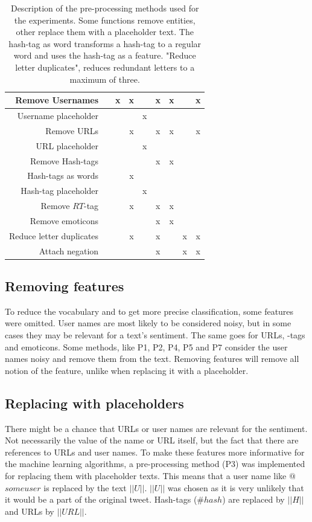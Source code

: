 \begin{table}[t!]
\begin{tabular}{|r||c|c|c|c|c|c|c|c|}
	 
		Remove Usernames                     & & x & x &   & x & x & & x \\ \hline
		Username placeholder       & &   &   & x &   &   & & \\ \hline
		Remove URLs                          & &   & x &   & x & x & & x \\ \hline
		URL placeholder        & &   &   & x &   &   & & \\ \hline
		Remove Hash-tags                     & &   &   &   & x & x & & \\ \hline
		Hash-tags as words                   & &   & x &   &   &   & & \\ \hline
		Hash-tag placeholder          & &   &   & x &   &   & & \\ \hline
		Remove $RT$-tag                      & &   & x &   & x & x & & \\ \hline
		Remove emoticons                     & &   &   &   & x & x & & \\ \hline
		Reduce letter duplicates             & &   & x &   & x &   & x & x \\ \hline
		Attach negation  & &   &   &   & x &   & x & x \\ \hline
	\end{tabular}
	\caption[Description of used pre-processing methods]{Description of the pre-processing methods used for the experiments. Some functions remove entities, other replace them with a placeholder text. The hash-tag as word transforms a hash-tag to a regular word and uses the hash-tag as a feature. "Reduce letter duplicates", reduces redundant letters to a maximum of three.}
	\label{tab:preproc_desc}
\end{table}

\subsection{Removing features}
To reduce the vocabulary and to get more precise classification, some features were omitted. User names are most likely to be considered noisy, but in some cases they may be relevant for a text's sentiment. The same goes for URLs, -tags and emoticons. Some methods, like P1, P2, P4, P5 and P7 consider the user names noisy and remove them from the text. Removing features will remove all notion of the feature, unlike when replacing it with a placeholder.

\subsection{Replacing with placeholders}
There might be a chance that URLs or user names are relevant for the sentiment. Not necessarily the value of the name or URL itself, but the fact that there are references to URLs and user names. To make these features more informative for the machine learning algorithms, a pre-processing method (P3) was implemented for replacing them with placeholder texts. This means that a user name like $@$$someuser$ is replaced by the text $||U||$. $||U||$ was chosen as it is very unlikely that it would be a part of the original tweet. Hash-tags ($\#hash$) are replaced by $||H||$ and URLs by $||URL||$. 

